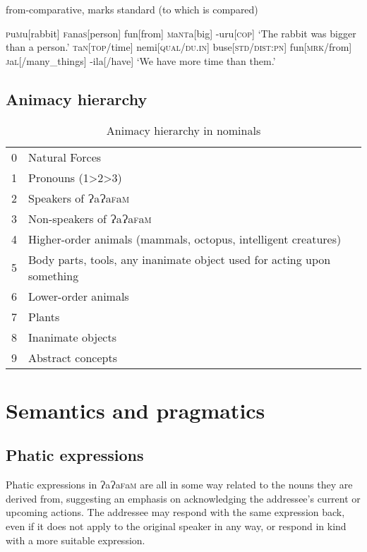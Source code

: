 \documentclass[a4paper,10pt,twoside,openright]{memoir}
\newcommand{\lang}{ɁaɁa\textsc{f}a\textsc{m}}
\newcommand{\famword}[5]{#1\textsc{#2}#3\textsc{#4}#5}
\begin{document}
from-comparative, marks standard (to which is compared)

\pex[interpartskip=3ex]
\a
\begingl
\famword{}{p}{u}{m}{u}[rabbit]
\famword{}{f}{ana}{s}{}[person]
fun[from]
\famword{}{m}{a}{nt}{a}[big]
-uru[\textsc{cop}]
\glft `The rabbit was bigger than a person.'
\endgl
\a
\begingl
\famword{}{t}{a}{n}{}[\textsc{top}/time]
nemi[\textsc{qual}/\textsc{du.in}]
buse[\textsc{std}/\textsc{dist:pn}]
fun[\textsc{mrk}/from]
\famword{}{j}{a}{l}{}[/many\_things]
-ila[/have]
\glft `We have more time than them.'
\endgl
\xe

\section{Animacy hierarchy}

\begin{table}[ht]
    \centering
    \begin{tabular}{ll}
    0 & Natural Forces \\
    1 & Pronouns (1>2>3) \\
    2 & Speakers of \lang{} \\
    3 & Non-speakers of \lang{} \\
    4 & Higher-order animals (mammals, octopus, intelligent creatures) \\
    5 & \parbox[t]{7cm}{Body parts, tools, any inanimate object used for acting upon something} \\
    6 & Lower-order animals \\
    7 & Plants \\
    8 & Inanimate objects \\
    9 & Abstract concepts 
    \end{tabular}
    \caption{Animacy hierarchy in nominals}
    \label{tab:hierarchy}
\end{table}

\chapter{Semantics and pragmatics}
\section{Phatic expressions}

Phatic expressions in \lang{} are all in some way related to the nouns they are derived from, suggesting an emphasis on acknowledging the addressee's current or upcoming actions. The addressee may respond with the same expression back, even if it does not apply to the original speaker in any way, or respond in kind with a more suitable expression.
\end{document}
